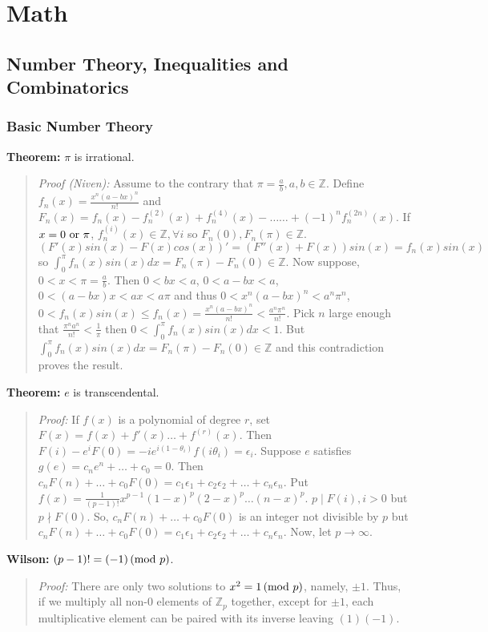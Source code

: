 \chapter{Math}
\section{Number Theory, Inequalities and Combinatorics}
\subsection{Basic Number Theory}
{\bf Theorem:}
$\pi$ is irrational.
\begin{quote}
\emph{Proof (Niven):}
Assume to the contrary that $\pi = {\frac a b}, a,b \in {\mathbb Z}$.
Define $f_n(x)= {\frac {x^n(a-bx)^n} {n!}}$ and
$F_n(x) = f_n(x) - f_n^{(2)}(x) + f_n^{(4)}(x) - \ldots
\ldots + (-1)^n f_n^{(2n)} (x)$. 
If $x= 0 \textnormal{ or } \pi$, 
$f_n^{(i)}(x) \in {\mathbb Z}, \forall i$ so
$F_n(0), F_n(\pi) \in {\mathbb Z}$.
$(F'(x) sin(x) - F(x) cos(x))'= (F''(x)+F(x))sin(x)=
f_n(x) sin(x)$ so
$\int_0^{\pi} f_n(x) sin(x) dx = F_n(\pi)-F_n(0) \in {\mathbb Z}$.  
Now suppose, $0<x<\pi={\frac a b}$. Then $0<bx<a$, $0<a-bx<a$,
$0 < (a-bx) x < a x < a \pi $ and thus 
$0 < x^n(a-bx)^n < a^n \pi^n$,
$0 < f_n(x) sin(x) \le f_n(x)={\frac {x^n(a-bx)^n} {n!}} < {\frac {a^n \pi^n}{n!}}$.
Pick $n$ large enough that ${\frac {\pi^n a^n} {n!}} < {\frac 1 {\pi}}$ then
$0< \int_0^{\pi} f_n(x) sin(x) dx < 1$.  But
$\int_0^{\pi} f_n(x) sin(x) dx = F_n(\pi)-F_n(0) \in {\mathbb Z}$ and this 
contradiction proves the result.
\end{quote}
{\bf Theorem:} $e$ is transcendental.
\begin{quote}
\emph{Proof:}
If $f(x)$ is a polynomial of degree $r$, set
$F(x)= f(x) + f'(x) \ldots + f^{(r)}(x)$.  Then
$F(i)-e^{i}F(0)= -i e^{i(1-\theta_{i})}f(i \theta_{i})= \epsilon_{i}$.
Suppose $e$ satisfies
$g(e)= c_{n}e^{n} + \ldots + c_{0}= 0$. Then
$c_{n}F(n) + \ldots + c_{0}F(0)= c_1 \epsilon_{1} +
c_2 \epsilon_{2} + \ldots + c_n \epsilon_{n}$.
Put $f(x)= {\frac {1} {(p-1)!}}
x^{p-1} (1-x)^{p} (2-x)^{p} \ldots (n-x)^{p}$.
$p \mid F(i), i>0$ but $p \nmid F(0)$.
So, $c_{n}F(n) + \ldots + c_{0}F(0)$ is an integer not divisible by $p$ but
$c_{n}F(n) + \ldots + c_{0}F(0)= c_1 \epsilon_{1} + c_2
\epsilon_{2} + \ldots + c_n \epsilon_{n}$.  Now,
let $p \rightarrow \infty$.
\end{quote}
{\bf Wilson:} $(p-1)! = (-1) \thinspace \textnormal{(mod } p \textnormal{)}$.
\begin{quote}
\emph{Proof:}  There are only two solutions to 
$x^2=1 \thinspace \textnormal{(mod } p \textnormal{)}$, namely, $\pm 1$.  Thus, 
if we multiply all non-$0$ elements of ${\mathbb Z}_p$ together,
except for $\pm 1$, each multiplicative element can 
be paired with its inverse leaving $(1)(-1)$.
\end{quote}
